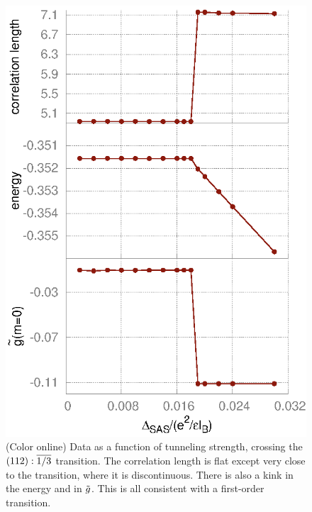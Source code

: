 \begin{figure}[ttt]
	\includegraphics[width=0.6\linewidth]{figures/A.eps}
	\caption{\label{Aplots} (Color online) Data as a function of tunneling strength, crossing the $(112):\overline{1/3}$ transition. The correlation length is flat except very close to the transition, where it is discontinuous. There is also a kink in the energy and in ${\tilde g}$. This is all consistent with a first-order transition. }
\end{figure}


